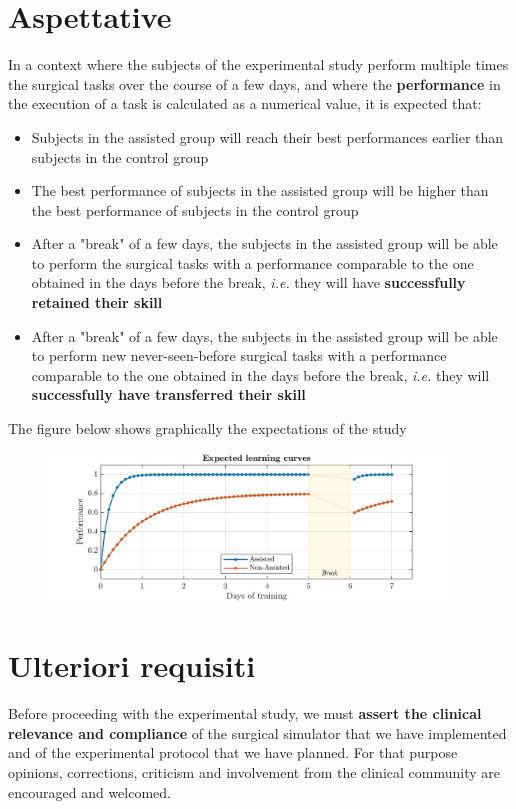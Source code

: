 \documentclass{article}
\begin{document}
\section{Aspettative}
In a context where the subjects of the experimental study perform multiple times the surgical tasks over the course of a few days, and where the \textbf{performance} in the execution of a task is calculated as a numerical value, it is expected that:
\begin{itemize}
  \item Subjects in the assisted group will reach their best performances earlier than subjects in the control group
  \item The best performance of subjects in the assisted group will be higher than the best performance of subjects in the control group
  \item After a "break" of a few days, the subjects in the assisted group will be able to perform the surgical tasks with a performance comparable to the one obtained in the days before the break, \textit{i.e.} they will have \textbf{successfully retained their skill}
  \item After a "break" of a few days, the subjects in the assisted group will be able to perform new never-seen-before surgical tasks with a performance comparable to the one obtained in the days before the break, \textit{i.e.} they will \textbf{successfully have transferred their skill}
\end{itemize} 
The figure below shows graphically the expectations of the study

\begin{figure}[!h]
  \centering
  \includegraphics[width=0.95\textwidth]{expected.jpg}
  \end{figure} 
\section{Ulteriori requisiti}
Before proceeding with the experimental study, we must \textbf{assert the clinical relevance and compliance} of the surgical simulator that we have implemented and of the experimental protocol that we have planned. For that purpose opinions, corrections, criticism and involvement from the clinical community are encouraged and welcomed. 
\end{document}
